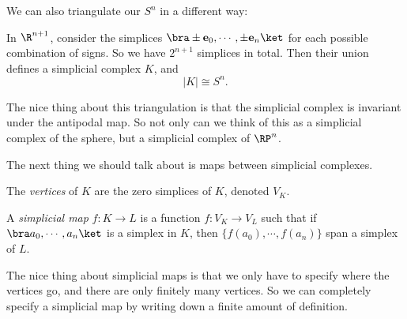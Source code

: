 \documentclass[a4paper]{article}
\begin{document}
We can also triangulate our $S^n$ in a different way:
\begin{eg}
  In $\R^{n + 1}$, consider the simplices $ \bra \pm \mathbf{e}_0, \cdots, \pm \mathbf{e}_n\ket$ for each possible combination of signs. So we have $2^{n + 1}$ simplices in total. Then their union defines a simplicial complex $K$, and
  \[
    |K| \cong S^n.
  \]
  \begin{center}
  \end{center}
\end{eg}
The nice thing about this triangulation is that the simplicial complex is invariant under the antipodal map. So not only can we think of this as a simplicial complex of the sphere, but a simplicial complex of $\RP^n$.

The next thing we should talk about is maps between simplicial complexes.

\begin{defi}[Vertices]
  The \emph{vertices} of $K$ are the zero simplices of $K$, denoted $V_K$.
\end{defi}

\begin{defi}
  A \emph{simplicial map} $f: K \to L$ is a function $f: V_K \to V_L$ such that if $\bra a_0, \cdots, a_n\ket$ is a simplex in $K$, then $\{f(a_0), \cdots, f(a_n)\}$ span a simplex of $L$.
\end{defi}
The nice thing about simplicial maps is that we only have to specify where the vertices go, and there are only finitely many vertices. So we can completely specify a simplicial map by writing down a finite amount of definition.
\end{document}
